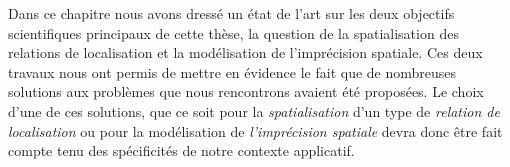 Dans ce chapitre nous avons dressé un état de l'art sur les deux
objectifs scientifiques principaux de cette thèse, la question de la
spatialisation des relations de localisation et la modélisation de
l'imprécision spatiale. Ces deux travaux nous ont permis de mettre en
évidence le fait que de nombreuses solutions aux problèmes que nous
rencontrons avaient été proposées. Le choix d'une de ces solutions,
que ce soit pour la \emph{spatialisation} d'un type de \emph{relation
  de localisation} ou pour la modélisation de \emph{l'imprécision
  spatiale} devra donc être fait compte tenu des spécificités de notre
contexte applicatif.


